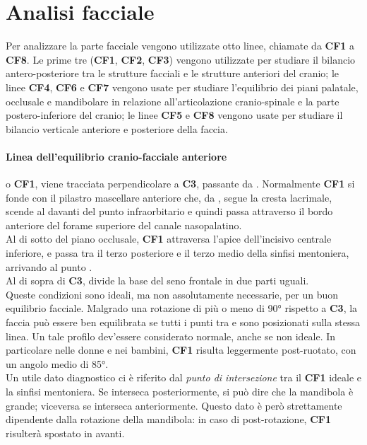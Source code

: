 \section{Analisi facciale}
Per analizzare la parte facciale vengono utilizzate otto linee, chiamate da \textbf{CF1} a \textbf{CF8}. Le prime tre (\textbf{CF1}, \textbf{CF2}, \textbf{CF3}) vengono utilizzate per studiare il bilancio antero-posteriore tra le strutture facciali e le strutture anteriori del cranio; le linee \textbf{CF4}, \textbf{CF6} e \textbf{CF7} vengono usate per studiare l'equilibrio dei piani palatale, occlusale e mandibolare in relazione all'articolazione cranio-spinale e la parte postero-inferiore del cranio; le linee \textbf{CF5} e \textbf{CF8} vengono usate per studiare il bilancio verticale anteriore e posteriore della faccia.\\

\paragraph{Linea dell'equilibrio cranio-facciale anteriore} o \textbf{CF1}, viene tracciata perpendicolare a \textbf{C3}, passante da . Normalmente \textbf{CF1} si fonde con il pilastro mascellare anteriore che, da , segue la cresta lacrimale, scende al davanti del punto infraorbitario e quindi passa attraverso il bordo anteriore del forame superiore del canale nasopalatino.\\
Al di sotto del piano occlusale, \textbf{CF1} attraversa l'apice dell'incisivo centrale inferiore, e passa tra il terzo posteriore e il terzo medio della sinfisi mentoniera, arrivando al punto .\\
Al di sopra di \textbf{C3}, divide la base del seno frontale in due parti uguali.\\
Queste condizioni sono ideali, ma non assolutamente necessarie, per un buon equilibrio facciale. Malgrado una rotazione di più o meno di 90° rispetto a \textbf{C3}, la faccia può essere ben equilibrata se tutti i punti tra  e  sono posizionati sulla stessa linea. Un tale profilo dev'essere considerato normale, anche se non ideale. In particolare nelle donne e nei bambini, \textbf{CF1} risulta leggermente post-ruotato, con un angolo medio di 85°.\\
Un utile dato diagnostico ci è riferito dal \emph{punto di intersezione} tra il \textbf{CF1} ideale e la sinfisi mentoniera. Se interseca posteriormente, si può dire che la mandibola è grande; viceversa se interseca anteriormente. Questo dato è però strettamente dipendente dalla rotazione della mandibola: in caso di post-rotazione, \textbf{CF1} risulterà spostato in avanti.\\

